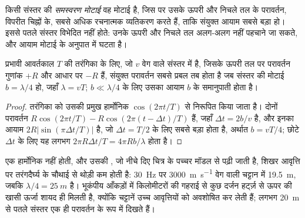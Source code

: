 \begin{definition}\label{def:b3:exploration-seismology:resolution}
किसी संस्तर की \emph{समस्वरण मोटाई} वह मोटाई है, जिस पर उसके ऊपरी और निचले तल के परावर्तन,
विपरीत चिह्नों के, सबसे अधिक रचनात्मक व्यतिकरण करते हैं, ताकि संयुक्त आयाम सबसे बड़ा हो।
इससे पतले संस्तर विभेदित नहीं होते: उनके ऊपरी और निचले तल अलग-अलग
नहीं पहचाने जा सकते, और
आयाम मोटाई के अनुपात में घटता है।
\end{definition}

\begin{proposition}[चौथाई-तरंगदैर्घ्य नियम]\label{prop:b3:exploration-seismology:tuning}
प्रभावी आवर्तकाल $T$ की तरंगिका के लिए, जो $v$ वेग वाले संस्तर में है,
जिसके ऊपरी तल पर परावर्तन गुणांक $+R$ और आधार पर $-R$ हैं, संयुक्त परावर्तन
सबसे प्रबल तब होता है जब संस्तर की मोटाई $b = \lambda/4$ हो, जहाँ $\lambda = vT$;
$b \ll \lambda/4$ के लिए उसका आयाम $b$ के समानुपाती होता है।
\end{proposition}

\begin{proof}
तरंगिका को उसकी प्रमुख हार्मोनिक $\cos(2\pi t/T)$ से निरूपित किया जाता है। दोनों
परावर्तन $R\cos(2\pi t/T) - R\cos(2\pi(t - \Delta t)/T)$ हैं, जहाँ
$\Delta t = 2b/v$ है, और इनका आयाम $2R|\sin(\pi\Delta t/T)|$ है, जो $\Delta t = T/2$ के लिए
सबसे बड़ा होता है, अर्थात $b = vT/4$; छोटे $\Delta t$ के लिए यह लगभग
$2\pi R\Delta t/T = 4\pi Rb/\lambda$ होता है।
\end{proof}

एक  हार्मोनिक नहीं होती, और उसकी , जो नीचे दिए चित्र के पच्चर मॉडल से पढ़ी जाती है,
शिखर आवृत्ति पर तरंगदैर्घ्य के चौथाई से थोड़ी कम होती है:
\qty{30}{Hz} पर \qty{3000}{m.s^{-1}} वेग वाली चट्टान में \qty{19.5}{m},
जबकि $\lambda/4 = \qty{25}{m}$ है। भूकंपीय आँकड़ों में किलोमीटरों की गहराई से
कुछ दर्जन हर्ट्ज़ से ऊपर की खासी ऊर्जा शायद ही मिलती है, क्योंकि
चट्टानें उच्च आवृत्तियों को अवशोषित कर लेती हैं; लगभग \qty{20}{m} से पतले संस्तर
एक ही परावर्तन के रूप में दिखते हैं।

